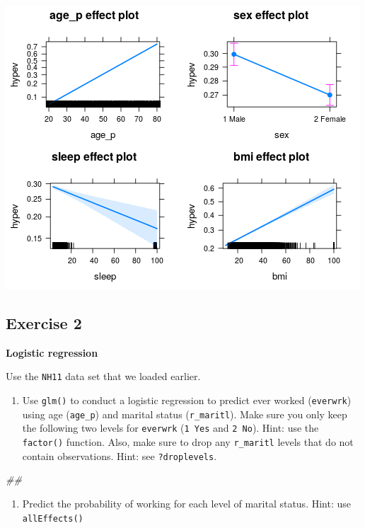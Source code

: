 \documentclass[]{book}
\newenvironment{Shaded}{\begin{snugshade}}{\end{snugshade}}
\newcommand{\CommentTok}[1]{\textcolor[rgb]{0.56,0.35,0.01}{\textit{#1}}}
\providecommand{\tightlist}{%
  \setlength{\itemsep}{0pt}\setlength{\parskip}{0pt}}
\begin{document}
\includegraphics{R/Rmodels/images/effects1.png}

\hypertarget{exercise-2}{%
\subsection{Exercise 2}\label{exercise-2}}

\textbf{Logistic regression}

Use the \texttt{NH11} data set that we loaded earlier.

\begin{enumerate}
\def\labelenumi{\arabic{enumi}.}
\tightlist
\item
  Use \texttt{glm()} to conduct a logistic regression to predict ever worked (\texttt{everwrk}) using age (\texttt{age\_p}) and marital status (\texttt{r\_maritl}). Make sure you only keep the following two levels for \texttt{everwrk} (\texttt{1\ Yes} and \texttt{2\ No}). Hint: use the \texttt{factor()} function. Also, make sure to drop any \texttt{r\_maritl} levels that do not contain observations. Hint: see \texttt{?droplevels}.
\end{enumerate}

\begin{Shaded}
\begin{Highlighting}[]
\CommentTok{## }
\end{Highlighting}
\end{Shaded}

\begin{enumerate}
\def\labelenumi{\arabic{enumi}.}
\setcounter{enumi}{1}
\tightlist
\item
  Predict the probability of working for each level of marital status. Hint: use \texttt{allEffects()}
\end{enumerate}
\end{document}
